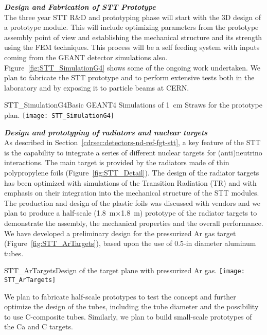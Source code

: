 \textbf{\textit{Design and Fabrication of STT Prototype}} \\
The three year STT R\&D and prototyping phase will start with the 3D
design of a prototype module.  This will include optimizing
parameters from the prototype assembly point of view and
establishing the mechanical structure and its strength using the FEM
techniques. This process will be a self feeding system with inputs
coming from the GEANT detector simulations also.
Figure~\ref{fig:STT_SimulationG4} shows some of the ongoing work
undertaken. We plan to fabricate the STT prototype and to perform
extensive tests both in the laboratory and by exposing it to particle
beams at CERN.

\begin{cdrfigure}
{STT_SimulationG4}{Basic GEANT4 Simulations of 1~cm Straws for the prototype plan.}
\texttt{[image: STT\_SimulationG4]}
\end{cdrfigure}


\textbf{ \textit{Design and prototyping of radiators and nuclear targets}} \\
As described in Section~\ref{cdrsec:detectors-nd-ref-fgt-stt}, a key
feature of the STT is the capability to integrate a series of
different nuclear targets for (anti)neutrino interactions.  The main
target is provided by the radiators made of thin polypropylene foils
(Figure~\ref{fig:STT_Detail}).  The design of the radiator targets has
been optimized with simulations of the Transition Radiation (TR) and
with emphasis on their integration into the mechanical structure of
the STT modules.  The production and design of the plastic foils was
discussed with vendors and we plan to produce a half-scale
(1.8~m$\times$1.8~m) prototype of the radiator targets to demonstrate
the assembly, the mechanical properties and the overall
performance. We have developed a preliminary design for the
pressurized Ar gas target (Figure~\ref{fig:STT_ArTargets}), based upon
the use of 0.5-in diameter aluminum tubes.
\begin{cdrfigure}
{STT_ArTargets}{Design of the target plane with pressurized Ar gas.}
\texttt{[image: STT\_ArTargets]}
\end{cdrfigure}
We plan to fabricate half-scale prototypes to test the concept and
further optimize the design of the tubes, including the tube diameter
and the possibility to use C-composite tubes.  Similarly, we plan to
build small-scale prototypes of the Ca and C targets.


